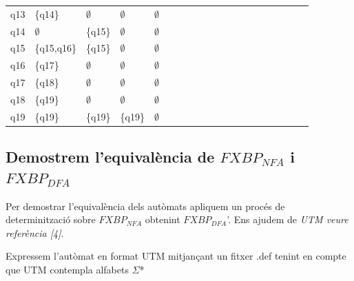 \documentclass[12pt,a4paper]{report}
\def \dfa{$FXBP_{DFA} $}
\def \nfa{$FXBP_{NFA} $}
\begin{document}
\begin{center}
\begin{table}[ht]
\begin{tabular}{ l l l l l l l l l l l l l l l l l l l l }
q13   & \{q14\}     & $\emptyset$ & $\emptyset$            & $\emptyset$             &  &  &  &  &  &  &  &  &  &  &  &  &  &  &  \\
q14   & $\emptyset$ & \{q15\}     & $\emptyset$            & $\emptyset$             &  &  &  &  &  &  &  &  &  &  &  &  &  &  &  \\
q15   & \{q15,q16\} & \{q15\}     & $\emptyset$            & $\emptyset$             &  &  &  &  &  &  &  &  &  &  &  &  &  &  &  \\
q16   & \{q17\}     & $\emptyset$ & $\emptyset$            & $\emptyset$             &  &  &  &  &  &  &  &  &  &  &  &  &  &  &  \\
q17   & \{q18\}     & $\emptyset$ & $\emptyset$            & $\emptyset$             &  &  &  &  &  &  &  &  &  &  &  &  &  &  &  \\
q18   & \{q19\}     & $\emptyset$ & $\emptyset$            & $\emptyset$             &  &  &  &  &  &  &  &  &  &  &  &  &  &  &  \\
q19   & \{q19\}     & \{q19\}     & \{q19\}                & $\emptyset$ &  &  &  &  &  &  &  &  &  &  &  &  &  &  & \\ \hline

\end{tabular}
\end{table}

\end{center}

\subsection{Demostrem l’equivalència de \nfa{} i \dfa{}}

Per demostrar l’equivalència dels autòmats apliquem un procés de determinització sobre \nfa{} obtenint \dfa{}'. Ens ajudem de \textit{UTM veure referència [4]}.

Expressem l’autòmat en format UTM mitjançant un fitxer .def tenint en compte que UTM contempla alfabets $\Sigma$*
\end{document}
